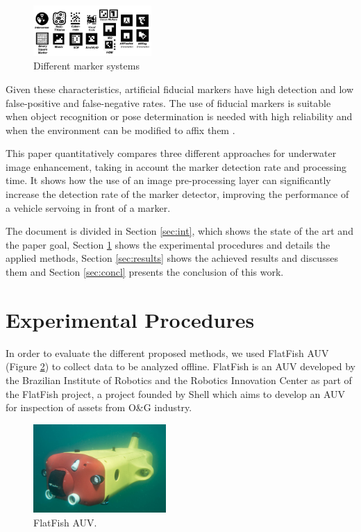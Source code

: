 \documentclass[conference, letterpaper]{IEEEtran}
\begin{document}
\begin{figure}[!ht]
	\centering
    \includegraphics[width=0.40\textwidth]{./fig/marker_systems.png}
    \caption[Different marker systems]{Different marker systems \cite{Fiala2010}}
	\label{fig:marker_systems}
\end{figure}

Given these characteristics, artificial fiducial markers have high detection
and low false-positive and false-negative rates. The use of fiducial markers is
suitable when object recognition or pose determination is needed with high
reliability and when the environment can be modified to affix them \cite{Fiala2010}. 

This paper quantitatively compares three different approaches for underwater
image enhancement, taking in account the marker detection rate and processing
time. It shows how the use of an image pre-processing layer can significantly
increase the detection rate of the marker detector, improving the performance
of a vehicle servoing in front of a marker.

The document is divided in Section \ref{sec:int}, which shows the state of the art
and the paper goal, Section \ref{sec:exp_proced} shows the experimental
procedures and details the applied methods, Section \ref{sec:results} shows the
achieved results and discusses them and Section \ref{sec:concl} presents the
conclusion of this work.

\section{Experimental Procedures} \label{sec:exp_proced}

In order to evaluate the different proposed methods, we used FlatFish AUV (Figure
\ref{fig:flatfish_1}) \cite{flatfish_jan} to collect data to be analyzed
offline. FlatFish is an AUV developed by the Brazilian Institute of Robotics
and the Robotics Innovation Center as part of the FlatFish project, a project
founded by Shell which aims to develop an AUV for inspection of assets from O\&G industry.

\begin{figure}[!ht]
    \centering
    \includegraphics[width=0.45\textwidth]{./fig/20160317-FF-Test-P1040442.jpg}
    \caption{FlatFish AUV.}
    \label{fig:flatfish_1}
\end{figure}
\end{document}
